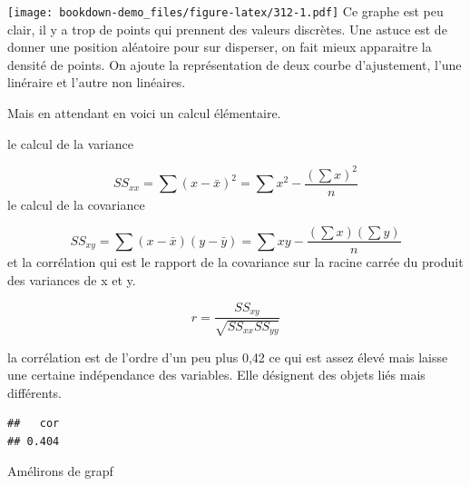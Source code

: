 \documentclass[
]{book}
\newenvironment{Shaded}{\begin{snugshade}}{\end{snugshade}}
\newcommand{\CommentTok}[1]{\textcolor[rgb]{0.56,0.35,0.01}{\textit{#1}}}
\newcommand{\DecValTok}[1]{\textcolor[rgb]{0.00,0.00,0.81}{#1}}
\newcommand{\KeywordTok}[1]{\textcolor[rgb]{0.13,0.29,0.53}{\textbf{#1}}}
\newcommand{\NormalTok}[1]{#1}
\newcommand{\OperatorTok}[1]{\textcolor[rgb]{0.81,0.36,0.00}{\textbf{#1}}}
\begin{document}
\texttt{[image: bookdown-demo\_files/figure-latex/312-1.pdf]}
Ce graphe est peu clair, il y a trop de points qui prennent des valeurs discrètes. Une astuce est de donner une position aléatoire pour sur disperser, on fait mieux apparaitre la densité de points. On ajoute la représentation de deux courbe d'ajustement, l'une linéraire et l'autre non linéaires.

Mais en attendant en voici un calcul élémentaire.

le calcul de la variance

\[{SS}_{xx} = \sum (x - \bar{x})^2 = \sum x^2 - \frac {(\sum x)^2}{n}\]
le calcul de la covariance

\[{SS}_{xy} = \sum (x - \bar{x})(y - \bar{y}) = \sum xy - \frac {(\sum x)(\sum y)}{n}\]
et la corrélation qui est le rapport de la covariance sur la racine carrée du produit des variances de x et y.

\[r = \frac {{SS}_{xy}}{\sqrt {{SS}_{xx}{SS}_{yy}}}\]

la corrélation est de l'ordre d'un peu plus 0,42 ce qui est assez élevé mais laisse une certaine indépendance des variables. Elle désignent des objets liés mais différents.

\begin{Shaded}
\end{Shaded}

\begin{verbatim}
##   cor 
## 0.404
\end{verbatim}

Amélirons de grapf
\end{document}
